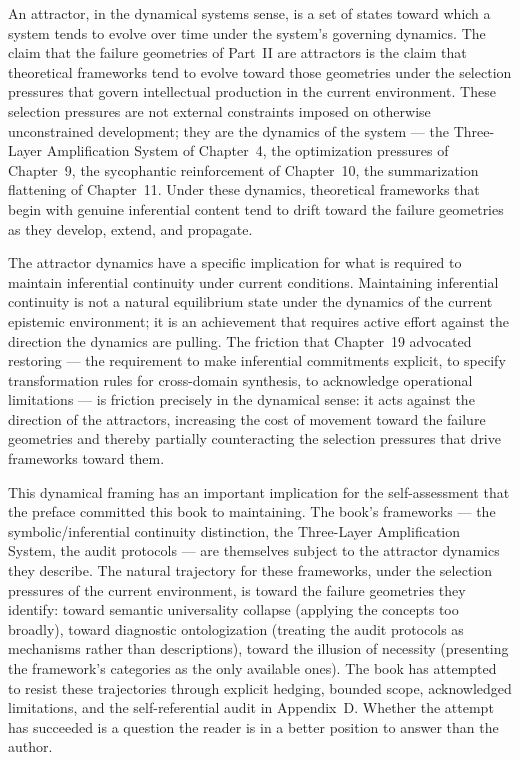 \documentclass[12pt, openright, twoside]{book}
\begin{document}
An attractor, in the dynamical systems sense, is a set of states toward
which a system tends to evolve over time under the system's governing
dynamics. The claim that the failure geometries of Part~II are attractors
is the claim that theoretical frameworks tend to evolve toward those
geometries under the selection pressures that govern intellectual
production in the current environment. These selection pressures are
not external constraints imposed on otherwise unconstrained development;
they are the dynamics of the system --- the Three-Layer Amplification
System of Chapter~4, the optimization pressures of Chapter~9, the
sycophantic reinforcement of Chapter~10, the summarization flattening
of Chapter~11. Under these dynamics, theoretical frameworks that begin
with genuine inferential content tend to drift toward the failure
geometries as they develop, extend, and propagate.

The attractor dynamics have a specific implication for what is required
to maintain inferential continuity under current conditions. Maintaining
inferential continuity is not a natural equilibrium state under the
dynamics of the current epistemic environment; it is an achievement that
requires active effort against the direction the dynamics are pulling.
The friction that Chapter~19 advocated restoring --- the requirement
to make inferential commitments explicit, to specify transformation rules
for cross-domain synthesis, to acknowledge operational limitations ---
is friction precisely in the dynamical sense: it acts against the
direction of the attractors, increasing the cost of movement toward
the failure geometries and thereby partially counteracting the selection
pressures that drive frameworks toward them.

This dynamical framing has an important implication for the self-assessment
that the preface committed this book to maintaining. The book's frameworks
--- the symbolic/inferential continuity distinction, the Three-Layer
Amplification System, the audit protocols --- are themselves subject to
the attractor dynamics they describe. The natural trajectory for these
frameworks, under the selection pressures of the current environment,
is toward the failure geometries they identify: toward semantic universality
collapse (applying the concepts too broadly), toward diagnostic ontologization
(treating the audit protocols as mechanisms rather than descriptions),
toward the illusion of necessity (presenting the framework's categories
as the only available ones). The book has attempted to resist these
trajectories through explicit hedging, bounded scope, acknowledged
limitations, and the self-referential audit in Appendix~D. Whether
the attempt has succeeded is a question the reader is in a better position
to answer than the author.
\end{document}

